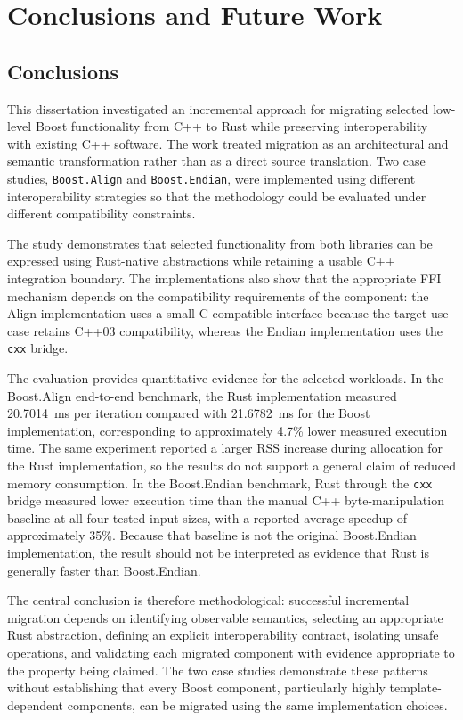 \chapter{Conclusions and Future Work}

\label{chap:Chapter7}

\section{Conclusions}
\label{sec:conclusions}

This dissertation investigated an incremental approach for migrating selected low-level Boost functionality from C++ to Rust while preserving interoperability with existing C++ software. The work treated migration as an architectural and semantic transformation rather than as a direct source translation. Two case studies, \texttt{Boost.Align} and \texttt{Boost.Endian}, were implemented using different interoperability strategies so that the methodology could be evaluated under different compatibility constraints.

The study demonstrates that selected functionality from both libraries can be expressed using Rust-native abstractions while retaining a usable C++ integration boundary. The implementations also show that the appropriate FFI mechanism depends on the compatibility requirements of the component: the Align implementation uses a small C-compatible interface because the target use case retains C++03 compatibility, whereas the Endian implementation uses the \texttt{cxx} bridge.

The evaluation provides quantitative evidence for the selected workloads. In the Boost.Align end-to-end benchmark, the Rust implementation measured 20.7014~ms per iteration compared with 21.6782~ms for the Boost implementation, corresponding to approximately 4.7\% lower measured execution time. The same experiment reported a larger RSS increase during allocation for the Rust implementation, so the results do not support a general claim of reduced memory consumption. In the Boost.Endian benchmark, Rust through the \texttt{cxx} bridge measured lower execution time than the manual C++ byte-manipulation baseline at all four tested input sizes, with a reported average speedup of approximately 35\%. Because that baseline is not the original Boost.Endian implementation, the result should not be interpreted as evidence that Rust is generally faster than Boost.Endian.

The central conclusion is therefore methodological: successful incremental migration depends on identifying observable semantics, selecting an appropriate Rust abstraction, defining an explicit interoperability contract, isolating unsafe operations, and validating each migrated component with evidence appropriate to the property being claimed. The two case studies demonstrate these patterns without establishing that every Boost component, particularly highly template-dependent components, can be migrated using the same implementation choices.

